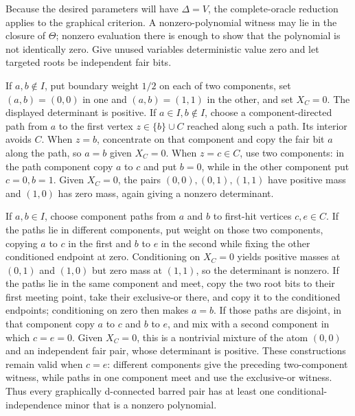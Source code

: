 Because the desired parameters will have \(\Delta=V\), the complete-oracle reduction applies to the graphical criterion. A nonzero-polynomial witness may lie in the closure of \(\Theta\); nonzero evaluation there is enough to show that the polynomial is not identically zero. Give unused variables deterministic value zero and let targeted roots be independent fair bits.

If \(a,b\notin I\), put boundary weight \(1/2\) on each of two components, set \((a,b)=(0,0)\) in one and \((a,b)=(1,1)\) in the other, and set \(X_C=0\). The displayed determinant is positive. If \(a\in I,b\notin I\), choose a component-directed path from \(a\) to the first vertex \(z\in\{b\}\cup C\) reached along such a path. Its interior avoids \(C\). When \(z=b\), concentrate on that component and copy the fair bit \(a\) along the path, so \(a=b\) given \(X_C=0\). When \(z=c\in C\), use two components: in the path component copy \(a\) to \(c\) and put \(b=0\), while in the other component put \(c=0,b=1\). Given \(X_C=0\), the pairs \((0,0),(0,1),(1,1)\) have positive mass and \((1,0)\) has zero mass, again giving a nonzero determinant.

If \(a,b\in I\), choose component paths from \(a\) and \(b\) to first-hit vertices \(c,e\in C\). If the paths lie in different components, put weight on those two components, copying \(a\) to \(c\) in the first and \(b\) to \(e\) in the second while fixing the other conditioned endpoint at zero. Conditioning on \(X_C=0\) yields positive masses at \((0,1)\) and \((1,0)\) but zero mass at \((1,1)\), so the determinant is nonzero. If the paths lie in the same component and meet, copy the two root bits to their first meeting point, take their exclusive-or there, and copy it to the conditioned endpoints; conditioning on zero then makes \(a=b\). If those paths are disjoint, in that component copy \(a\) to \(c\) and \(b\) to \(e\), and mix with a second component in which \(c=e=0\). Given \(X_C=0\), this is a nontrivial mixture of the atom \((0,0)\) and an independent fair pair, whose determinant is positive. These constructions remain valid when \(c=e\): different components give the preceding two-component witness, while paths in one component meet and use the exclusive-or witness. Thus every graphically d-connected barred pair has at least one conditional-independence minor that is a nonzero polynomial.

